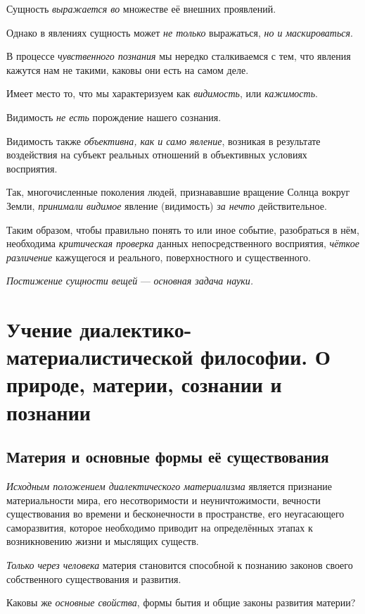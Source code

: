 \documentclass[a4paper,14pt,russian]{extreport}
\begin{document}
Сущность \emph{выражается во} множестве её внешних проявлений.

Однако в явлениях сущность может \emph{не только} выражаться, \emph{но и} \emph{маскироваться}.

В процессе \emph{чувственного познания} мы нередко сталкиваемся с тем, что явления кажутся нам не такими, каковы они есть на самом деле.

Имеет место то, что мы характеризуем как \emph{видимость}, или \emph{кажимость}.

Видимость \emph{не есть} порождение нашего сознания.

Видимость также \emph{объективна, как и само явление}, возникая в результате воздействия на субъект реальных отношений в объективных условиях восприятия.

Так, многочисленные поколения людей, признававшие вращение Солнца вокруг Земли, \emph{принимали видимое} явление (видимость) \emph{за нечто} действительное.

Таким образом, чтобы правильно понять то или иное событие, разобраться в нём, необходима \emph{критическая проверка} данных непосредственного восприятия, \emph{чёткое различение} кажущегося и реального, поверхностного и существенного.

\emph{Постижение сущности вещей} --- \emph{основная задача науки.}

\chapter{Учение диалектико-материалистической философии. О природе, материи, сознании и познании}

\section{Материя и основные формы её существования}

\emph{Исходным положением диалектического материализма} является признание материальности мира, его несотворимости и неуничтожимости, вечности существования во времени и бесконечности в пространстве, его неугасающего саморазвития, которое необходимо приводит на определённых этапах к возникновению жизни и мыслящих существ.

\emph{Только через человека} материя становится способной к познанию законов своего собственного существования и развития.

Каковы же \emph{основные свойства}, формы бытия и общие законы развития материи?
\end{document}

